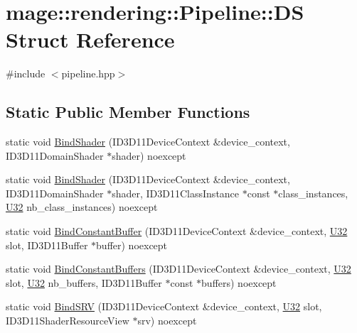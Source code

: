 \hypertarget{structmage_1_1rendering_1_1_pipeline_1_1_d_s}{}\section{mage\+:\+:rendering\+:\+:Pipeline\+:\+:DS Struct Reference}
\label{structmage_1_1rendering_1_1_pipeline_1_1_d_s}


{\ttfamily \#include $<$pipeline.\+hpp$>$}

\subsection*{Static Public Member Functions}
\begin{DoxyCompactItemize}
\item 
static void \mbox{\hyperlink{structmage_1_1rendering_1_1_pipeline_1_1_d_s_a2750045ec8b08182d6cb3c7656c3927e}{Bind\+Shader}} (I\+D3\+D11\+Device\+Context \&device\+\_\+context, I\+D3\+D11\+Domain\+Shader $\ast$shader) noexcept
\item 
static void \mbox{\hyperlink{structmage_1_1rendering_1_1_pipeline_1_1_d_s_a421c3f1e8b64c852ab0aad40ea0b1284}{Bind\+Shader}} (I\+D3\+D11\+Device\+Context \&device\+\_\+context, I\+D3\+D11\+Domain\+Shader $\ast$shader, I\+D3\+D11\+Class\+Instance $\ast$const $\ast$class\+\_\+instances, \mbox{\hyperlink{namespacemage_aa5d6eaabaac3cdd01873d6a3d27e90f3}{U32}} nb\+\_\+class\+\_\+instances) noexcept
\item 
static void \mbox{\hyperlink{structmage_1_1rendering_1_1_pipeline_1_1_d_s_ae8ce765a7dd9ca7cf548365416bb675a}{Bind\+Constant\+Buffer}} (I\+D3\+D11\+Device\+Context \&device\+\_\+context, \mbox{\hyperlink{namespacemage_aa5d6eaabaac3cdd01873d6a3d27e90f3}{U32}} slot, I\+D3\+D11\+Buffer $\ast$buffer) noexcept
\item 
static void \mbox{\hyperlink{structmage_1_1rendering_1_1_pipeline_1_1_d_s_a1f80ded4e3e9d0d16ce7eb03f9563241}{Bind\+Constant\+Buffers}} (I\+D3\+D11\+Device\+Context \&device\+\_\+context, \mbox{\hyperlink{namespacemage_aa5d6eaabaac3cdd01873d6a3d27e90f3}{U32}} slot, \mbox{\hyperlink{namespacemage_aa5d6eaabaac3cdd01873d6a3d27e90f3}{U32}} nb\+\_\+buffers, I\+D3\+D11\+Buffer $\ast$const $\ast$buffers) noexcept
\item 
static void \mbox{\hyperlink{structmage_1_1rendering_1_1_pipeline_1_1_d_s_ac5d97ad6f88b932a03fd73e6529f0466}{Bind\+S\+RV}} (I\+D3\+D11\+Device\+Context \&device\+\_\+context, \mbox{\hyperlink{namespacemage_aa5d6eaabaac3cdd01873d6a3d27e90f3}{U32}} slot, I\+D3\+D11\+Shader\+Resource\+View $\ast$srv) noexcept

\end{DoxyCompactItemize}
